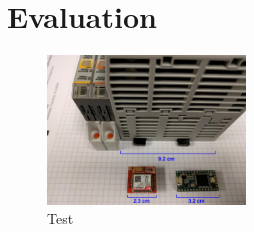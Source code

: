 \section{Evaluation}
\label{sec:evaluation}

\begin{figure}[th]
	\includegraphics[width=0.47\textwidth]{figures/eval_size}
	\centering
	\caption{Test}
	\label{fig:eval_size}
\end{figure}


